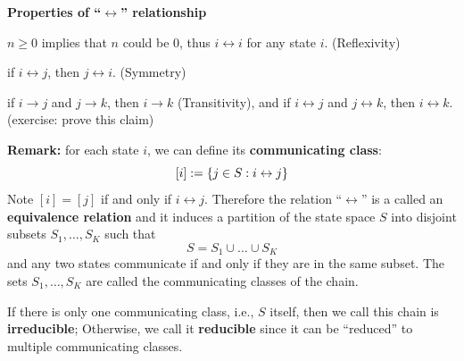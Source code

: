 \documentclass[english,10pt]{beamer}
\begin{document}
\begin{frame}

{\bf Properties of ``$\leftrightarrow$'' relationship} 
\biz[<+->]
 \item $n\geq 0$ implies that $n$ could be $0$, thus $i\leftrightarrow i$ for any state $i$. (Reflexivity)

\item if $i\leftrightarrow j$, then $j\leftrightarrow i$. (Symmetry)
\item if $i\to j$ and $j\to k$, then $i\to k$  (Transitivity),
and if $i\leftrightarrow j$ and $j\leftrightarrow k$, then $i\leftrightarrow k$. 
(exercise: prove this claim)
 \eiz
 
 \pause 

\bigskip
 {\bf Remark:} for each state $i$, we can define  its  {\bf communicating class}:
 \[ [i]:=\left\{j\in S:  i\leftrightarrow j\right\} \]
Note $[i]=[j]$ if and only if $i\leftrightarrow j$.
\pause
 Therefore the relation ``$\leftrightarrow$'' is a called an 
 {\bf equivalence relation} and it induces a partition of the state space $S$ into disjoint subsets 
 $S_1,\ldots, S_K$ such that 
 \[S = S_1 \cup \ldots \cup S_K \]
 and any two states communicate if and only if they are in the same subset.
 The sets  $S_1,\ldots, S_K$ are called the {  communicating classes} of the chain.
 \par
 If there is only one communicating class, i.e., $S$ itself,
 then we call this chain is  {\bf irreducible};
 Otherwise, we call it {\bf reducible }   since it can be ``reduced'' to multiple  communicating classes.
 
\end{frame}
\end{document}
